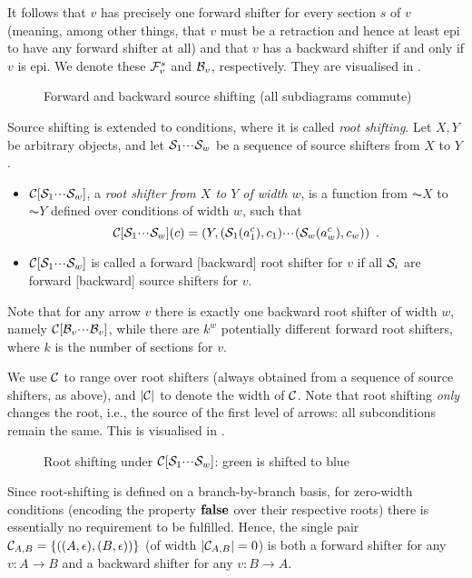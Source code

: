 %
It follows that $v$ has precisely one forward shifter for every section $s$ of $v$ (meaning, among other things, that $v$ must be a retraction and hence at least epi to have any forward shifter at all) and that $v$ has a backward shifter if and only if $v$ is epi. We denote these $\mathcal{F}_v^s$ and $\mathcal{B}_v$, respectively. They are visualised in .

\begin{figure}
\centering

\caption{Forward and backward source shifting (all subdiagrams commute)}
\end{figure}

Source shifting is extended to conditions, where it is called \emph{root shifting}. Let $X,Y$ be arbitrary objects, and let $\mathcal{S}_1{\cdotp\mkern-2mu\cdotp\mkern-2mu\cdotp\mkern1mu} \mathcal{S}_w$ be a sequence of source shifters from $X$ to $Y$.
%
\begin{itemize}
\item $\mathcal{C}[\mathcal{S}_1{\cdotp\mkern-2mu\cdotp\mkern-2mu\cdotp\mkern1mu} \mathcal{S}_w]$, a \emph{root shifter from $X$ to $Y$ of width $w$}, is a function from $\AC X$ to $\AC Y$ defined over conditions of width $w$, such that 
\[ \mathcal{C}[\mathcal{S}_1{\cdotp\mkern-2mu\cdotp\mkern-2mu\cdotp\mkern1mu} \mathcal{S}_w](c) = (Y,(\mathcal{S}_1(a^c_1),c_1){\cdotp\mkern-2mu\cdotp\mkern-2mu\cdotp\mkern1mu} (\mathcal{S}_w(a^c_w),c_w)) \enspace.
\]
\item $\mathcal{C}[\mathcal{S}_1{\cdotp\mkern-2mu\cdotp\mkern-2mu\cdotp\mkern1mu} \mathcal{S}_w]$ is called a forward [backward] root shifter for $v$ if all $\mathcal{S}_i$ are forward [backward] source shifters for $v$.
\end{itemize}
%
Note that for any arrow $v$ there is exactly one backward root shifter of width $w$, namely $\mathcal{C}[\mathcal{B}_v{\cdotp\mkern-2mu\cdotp\mkern-2mu\cdotp\mkern1mu} \mathcal{B}_v]$, while there are $k^w$ potentially different forward root shifters, where $k$ is the number of sections for $v$.

We use $\mathcal{C}$ to range over root shifters (always obtained from a sequence of source shifters, as above), and $|\mathcal{C}|$ to denote the width of $\mathcal{C}$. Note that root shifting \emph{only} changes the root, i.e., the source of the first level of arrows: all subconditions remain the same. This is visualised in .
%
\begin{figure}
\centering

\caption{Root shifting under $\mathcal{C}[\mathcal{S}_1{\cdotp\mkern-2mu\cdotp\mkern-2mu\cdotp\mkern1mu} \mathcal{S}_w]$: green is shifted to blue}
\end{figure}

Since root-shifting is defined on a branch-by-branch basis, for zero-width conditions (encoding the property $\textbf{false}$ over their respective roots) there is essentially no requirement to be fulfilled. Hence, the single pair $\mathcal{C}_{A,B}=\{{((A,\epsilon),(B,\epsilon))}\}$ (of width $|\mathcal{C}_{A,B}|=0$) is both a forward shifter for any $v:A\to B$ and a backward shifter for any $v:B\to A$.

